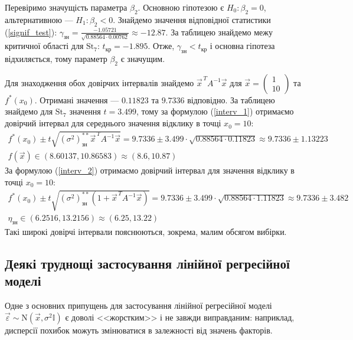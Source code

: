 Перевіримо значущість параметра $\beta_2$. Основною гіпотезою є $H_0 : \beta_2 = 0$,
альтернативною --- $H_1 : \beta_2 < 0$. Знайдемо значення відповідної статистики
(\ref{signif_test}): $\gamma_\text{зн} = \frac{
    -1.05721
}{
    \sqrt{0.88564 \cdot 0.00762}
} \approx - 12.87$. 
За таблицею знайдемо межу критичної області для $\mathrm{St}_7$: $t_\text{кр} = -1.895$.
Отже, $\gamma_\text{зн} < t_\text{кр}$ і основна гіпотеза відхиляється, тому параметр $\beta_2$ є значущим.

Для знаходження обох довірчих інтервалів знайдемо 
$\vec{x}^{\, T} A^{-1} \vec{x}$ для $\vec{x} = \begin{pmatrix}
    1 \\ 10
\end{pmatrix}$ та $f^*(x_0)$. Отримані значення --- $0.11823$ та $9.7336$ відповідно.
За таблицею знайдемо для $\mathrm{St}_7$ значення $t = 3.499$, тому за формулою
(\ref{interv_1}) отримаємо довірчий інтервал для середнього значення відклику в точці $x_0 = 10$:
\begin{gather*}
    f^*(x_0) \pm t \sqrt{(\sigma^2)^{**}_{\text{зн}} \vec{x}^{\, T} A^{-1} \vec{x}} =
    9.7336 \pm 3.499\cdot\sqrt{0.88564 \cdot 0.11823} \approx 9.7336 \pm 1.13223 \\
    f(\vec{x}) \in 
    \left(
        8.60137, 
        10.86583
    \right) \approx \left(8.6, 10.87\right)
\end{gather*}
За формулою (\ref{interv_2}) отримаємо довірчий інтервал для значення відклику в точці $x_0 = 10$:
\begin{gather*}
    f^*(x_0) \pm t \sqrt{(\sigma^2)^{**}_{\text{зн}}\left(1 + \vec{x}^{\, T} A^{-1} \vec{x}\right)} = 
    9.7336 \pm 3.499\cdot\sqrt{0.88564 \cdot 1.11823} \approx 9.7336 \pm 3.482 \\
    \eta_\text{зн} \in \left(6.2516, 13.2156\right) \approx \left(6.25, 13.22\right)
\end{gather*}
Такі широкі довірчі інтервали пояснюються, зокрема, малим обсягом вибірки.

\subsection{Деякі труднощі застосування лінійної регресійної моделі}
Одне з основних припущень для застосування лінійної регресійної моделі $\vec{\varepsilon} \sim \mathrm{N}(\vec{x}, \sigma^2 \mathbb{I})$ є доволі
<<жорстким>> і не завжди виправданим: наприклад, дисперсії похибок можуть змінюватися в залежності від значень факторів.

